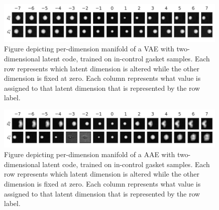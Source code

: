 \documentclass[journal, peerreview]{IEEEtran}
\begin{document}
\begin{figure}[!t]
    \centering
    \includegraphics[width=0.9\linewidth]{figs/manifold_vae.pdf}
    \caption{Figure depicting per-dimension manifold of a VAE with two-dimensional latent code, trained on in-control gasket samples. Each row represents which latent dimension is altered while the other dimension is fixed at zero. Each column represents what value is assigned to that latent dimension that is represented by the row label.}
    \label{fig:manifold_vae}
\end{figure}


\begin{figure}[!t]
    \centering
    \includegraphics[width=0.9\linewidth]{figs/manifold_aae.pdf}
    \caption{Figure depicting per-dimension manifold of a AAE with two-dimensional latent code, trained on in-control gasket samples. Each row represents which latent dimension is altered while the other dimension is fixed at zero. Each column represents what value is assigned to that latent dimension that is represented by the row label.}
    \label{fig:manifold_aae}
\end{figure}
\end{document}
